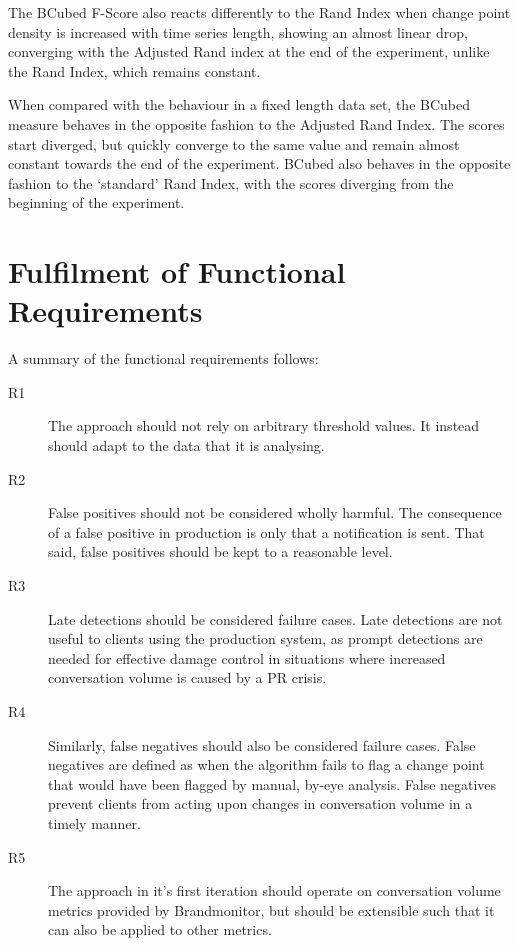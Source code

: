 \documentclass[../main.tex]{subfiles}
\begin{document}
The BCubed F-Score also reacts differently to the Rand Index when change point density is increased with time series length, showing an almost linear drop, converging with the Adjusted Rand index at the end of the experiment, unlike the Rand Index, which remains constant.

When compared with the behaviour in a fixed length data set, the BCubed measure behaves in the opposite fashion to the Adjusted Rand Index. The scores start diverged, but quickly converge to the same value and remain almost constant towards the end of the experiment. BCubed also behaves in the opposite fashion to the `standard' Rand Index, with the scores diverging from the beginning of the experiment.

\section{Fulfilment of Functional Requirements}
\label{requirements fulfilment}

A summary of the functional requirements follows:

\begin{description}
    \item[R1] The approach should not rely on arbitrary threshold values. It instead should adapt to the data that it is analysing.
    \item[R2] False positives should not be considered wholly harmful. The consequence of a false positive in production is only that a notification is sent. That said, false positives should be kept to a reasonable level.
    \item[R3] Late detections should be considered failure cases. Late detections are not useful to clients using the production system, as prompt detections are needed for effective damage control in situations where increased conversation volume is caused by a PR crisis.
    \item[R4] Similarly, false negatives should also be considered failure cases. False negatives are defined as when the algorithm fails to flag a change point that would have been flagged by manual, by-eye analysis. False negatives prevent clients from acting upon changes in conversation volume in a timely manner.
    \item[R5] The approach in it's first iteration should operate on conversation volume metrics provided by Brandmonitor, but should be extensible such that it can also be applied to other metrics.
\end{description}
\end{document}

